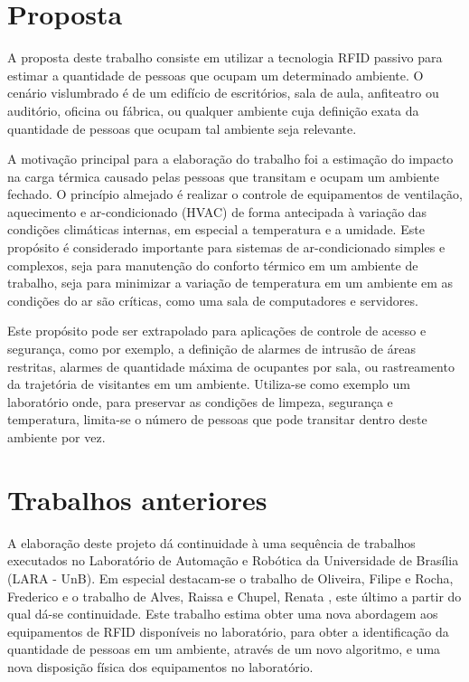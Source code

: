 \section{Proposta}

A proposta deste trabalho consiste em utilizar a tecnologia RFID passivo para estimar a quantidade de pessoas que ocupam um determinado ambiente. O cenário vislumbrado é de um edifício de escritórios, sala de aula, anfiteatro ou auditório, oficina ou fábrica, ou qualquer ambiente cuja definição exata da quantidade de pessoas que ocupam tal ambiente seja relevante.

A motivação principal para a elaboração do trabalho foi a estimação do impacto na carga térmica causado pelas pessoas que transitam e ocupam um ambiente fechado. O princípio almejado é realizar o controle de equipamentos de ventilação, aquecimento e ar-condicionado (HVAC) de forma antecipada à variação das condições climáticas internas, em especial a temperatura e a umidade. Este propósito é considerado importante para sistemas de ar-condicionado simples e complexos, seja para manutenção do conforto térmico em um ambiente de trabalho, seja para minimizar a variação de temperatura em um ambiente em as condições do ar são críticas, como uma sala de computadores e servidores.

Este propósito pode ser extrapolado para aplicações de controle de acesso e segurança, como por exemplo, a definição de alarmes de intrusão de áreas restritas, alarmes de quantidade máxima de ocupantes por sala, ou rastreamento da trajetória de visitantes em um ambiente. Utiliza-se como exemplo um laboratório onde, para preservar as condições de limpeza, segurança e temperatura, limita-se o número de pessoas que pode transitar dentro deste ambiente por vez.

\section{Trabalhos anteriores}

A elaboração deste projeto dá continuidade à uma sequência de trabalhos executados no Laboratório de Automação e Robótica da Universidade de Brasília (LARA - UnB). Em especial destacam-se o trabalho de Oliveira, Filipe e Rocha, Frederico \cite{TG2013OliveiraERocha} e o trabalho de Alves, Raissa e Chupel, Renata \cite{TG2015RaissaERenata}, este último a partir do qual dá-se continuidade.
Este trabalho estima obter uma nova abordagem aos equipamentos de RFID disponíveis no laboratório, para obter a identificação da quantidade de pessoas em um ambiente, através de um novo algoritmo, e uma nova disposição física dos equipamentos no laboratório.

